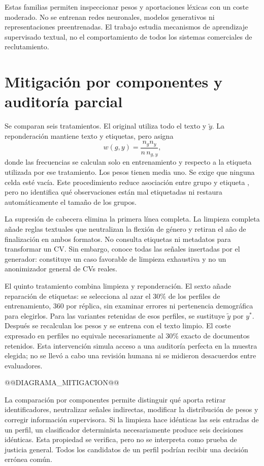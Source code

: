 Estas familias permiten inspeccionar pesos y aportaciones léxicas con un coste moderado. No se entrenan redes neuronales, modelos generativos ni representaciones preentrenadas. El trabajo estudia mecanismos de aprendizaje supervisado textual, no el comportamiento de todos los sistemas comerciales de reclutamiento.

\section{Mitigación por componentes y auditoría parcial}
Se comparan seis tratamientos. El original utiliza todo el texto y $\tilde y$. La reponderación mantiene texto y etiquetas, pero asigna
\begin{equation}
 w(g,y)=\frac{n_g n_y}{n\,n_{g,y}},
\end{equation}
donde las frecuencias se calculan solo en entrenamiento y respecto a la etiqueta utilizada por ese tratamiento. Los pesos tienen media uno. Se exige que ninguna celda esté vacía. Este procedimiento reduce asociación entre grupo y etiqueta \cite{kamiran2012}, pero no identifica qué observaciones están mal etiquetadas ni restaura automáticamente el tamaño de los grupos.

La supresión de cabecera elimina la primera línea completa. La limpieza completa añade reglas textuales que neutralizan la flexión de género y retiran el año de finalización en ambos formatos. No consulta etiquetas ni metadatos para transformar un CV. Sin embargo, conoce todas las señales insertadas por el generador: constituye un caso favorable de limpieza exhaustiva y no un anonimizador general de CVs reales.

El quinto tratamiento combina limpieza y reponderación. El sexto añade reparación de etiquetas: se selecciona al azar el 30\% de los perfiles de entrenamiento, 360 por réplica, sin examinar errores ni pertenencia demográfica para elegirlos. Para las variantes retenidas de esos perfiles, se sustituye $\tilde y$ por $y^*$. Después se recalculan los pesos y se entrena con el texto limpio. El coste expresado en perfiles no equivale necesariamente al 30\% exacto de documentos retenidos. Esta intervención simula acceso a una auditoría perfecta en la muestra elegida; no se llevó a cabo una revisión humana ni se midieron desacuerdos entre evaluadores.

@@DIAGRAMA_MITIGACION@@

La comparación por componentes permite distinguir qué aporta retirar identificadores, neutralizar señales indirectas, modificar la distribución de pesos y corregir información supervisora. Si la limpieza hace idénticas las seis entradas de un perfil, un clasificador determinista necesariamente produce seis decisiones idénticas. Esta propiedad se verifica, pero no se interpreta como prueba de justicia general. Todos los candidatos de un perfil podrían recibir una decisión errónea común.

